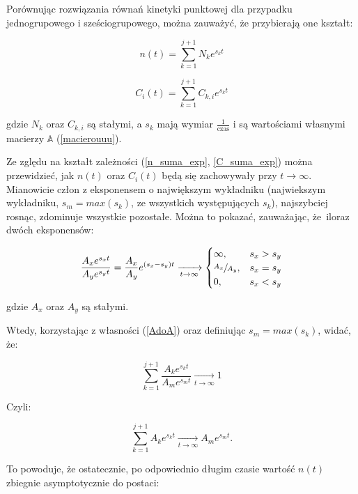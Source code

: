 Porównując rozwiązania równań kinetyki punktowej dla przypadku jednogrupowego i sześciogrupowego, można zauważyć, że przybierają one kształt:

\begin{equation}
n(t)=\sum\limits_{k=1}^{j+1}N_ke^{s_kt}
\label{n_suma_exp}
\end{equation}

\begin{equation}
C_i(t)=\sum\limits_{k=1}^{j+1}C_{k,i}e^{s_kt}
\label{C_suma_exp}
\end{equation}

\noindent gdzie $N_k$ oraz $C_{k,i}$ są stałymi, a $s_k$ mają wymiar $\frac{1}{\mathrm{czas}}$ i są wartościami własnymi macierzy $\mathbb{A}$ (\ref{macierouuu}).

Ze zględu na kształt zależności (\ref{n_suma_exp}, \ref{C_suma_exp}) można przewidzieć, jak $n(t)$ oraz $C_i(t)$ będą się zachowywały przy $t\rightarrow\infty$. Mianowicie człon z eksponensem o największym wykładniku (najwiekszym wykładniku, $s_m=max(s_k)$, ze wszystkich występujących $s_k$), najszybciej rosnąc, zdominuje wszystkie pozostałe. Można to pokazać, zauważając, że~iloraz dwóch eksponensów:

\begin{equation}
\frac{A_xe^{s_xt}}{A_ye^{s_yt}}=\frac{A_x}{A_y}e^{(s_x-s_y)t}\xrightarrow[t\rightarrow\infty]{}
\begin{cases}
    \infty,& s_x>s_y\\
    \sfrac{A_x}{A_y},& s_x=s_y \\
    0,              & s_x<s_y
\end{cases}
\label{AdoA}
\end{equation}

\noindent gdzie $A_x$ oraz $A_y$ są stałymi.

Wtedy, korzystając z własności (\ref{AdoA}) oraz definiując $s_m=max(s_k)$, widać, że:

\begin{equation}
\sum\limits_{k=1}^{j+1}\frac{A_ke^{s_kt}}{A_me^{s_mt}}\xrightarrow[t\rightarrow\infty]{ }1
\label{tralala}
\end{equation}

\noindent Czyli:

\begin{equation}
\sum\limits_{k=1}^{j+1}A_ke^{s_kt}\xrightarrow[t\rightarrow\infty]{ } A_me^{s_mt}.
\label{tralala2}
\end{equation}

\noindent To powoduje, że ostatecznie, po odpowiednio długim czasie wartość $n(t)$ zbiegnie asymptotycznie do postaci:

